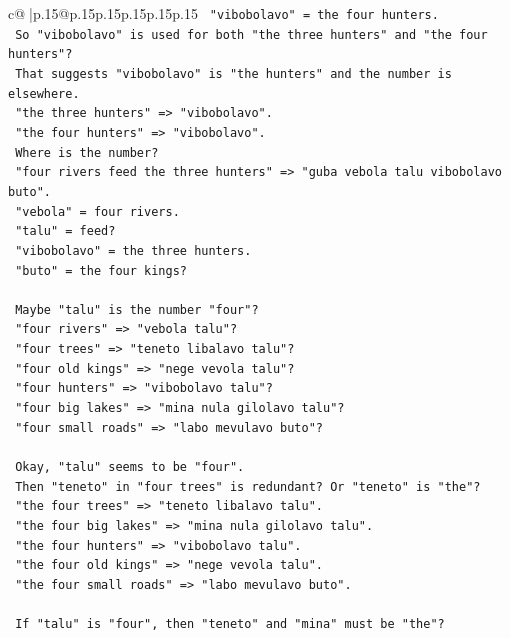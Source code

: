 \documentclass{article}
\begin{document}
{\begin{supertabular}{c@{$\;$}|p{.15\linewidth}@{}p{.15\linewidth}p{.15\linewidth}p{.15\linewidth}p{.15\linewidth}p{.15\linewidth}}
{{{\texttt{   "vibobolavo" = the four hunters.} \\
\texttt{   So "vibobolavo" is used for both "the three hunters" and "the four hunters"?} \\
\texttt{   That suggests "vibobolavo" is "the hunters" and the number is elsewhere.} \\
\texttt{   "the three hunters" => "vibobolavo".} \\
\texttt{   "the four hunters" => "vibobolavo".} \\
\texttt{   Where is the number?} \\
\texttt{   "four rivers feed the three hunters" => "guba vebola talu vibobolavo buto".} \\
\texttt{   "vebola" = four rivers.} \\
\texttt{   "talu" = feed?} \\
\texttt{   "vibobolavo" = the three hunters.} \\
\texttt{   "buto" = the four kings?} \\
\\ 
\texttt{   Maybe "talu" is the number "four"?} \\
\texttt{   "four rivers" => "vebola talu"?} \\
\texttt{   "four trees" => "teneto libalavo talu"?} \\
\texttt{   "four old kings" => "nege vevola talu"?} \\
\texttt{   "four hunters" => "vibobolavo talu"?} \\
\texttt{   "four big lakes" => "mina nula gilolavo talu"?} \\
\texttt{   "four small roads" => "labo mevulavo buto"?} \\
\\ 
\texttt{   Okay, "talu" seems to be "four".} \\
\texttt{   Then "teneto" in "four trees" is redundant? Or "teneto" is "the"?} \\
\texttt{   "the four trees" => "teneto libalavo talu".} \\
\texttt{   "the four big lakes" => "mina nula gilolavo talu".} \\
\texttt{   "the four hunters" => "vibobolavo talu".} \\
\texttt{   "the four old kings" => "nege vevola talu".} \\
\texttt{   "the four small roads" => "labo mevulavo buto".} \\
\\ 
\texttt{   If "talu" is "four", then "teneto" and "mina" must be "the"?} \\
}}}
\end{supertabular}}
\end{document}
